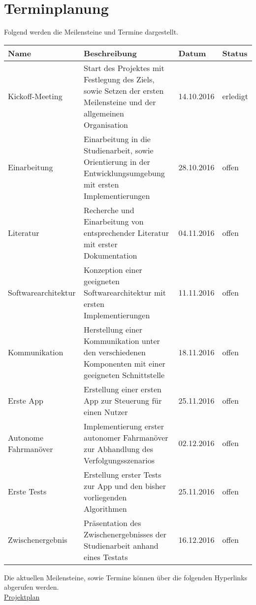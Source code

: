 \section{Terminplanung}

Folgend werden die Meilensteine und Termine dargestellt.\\

\begin{center}
	\begin{tabular}{ | p{} | p{} | p{2cm} | p{2cm} |}
		\hline
		Name & Beschreibung & Datum & Status \\ \hline
		
		Kickoff-Meeting & Start des Projektes mit Festlegung des Ziels, sowie Setzen der ersten Meilensteine und der allgemeinen Organisation & 14.10.2016 & erledigt \\ \hline
		
		Einarbeitung & Einarbeitung in die Studienarbeit, sowie Orientierung in der Entwicklungsumgebung mit ersten Implementierungen & 28.10.2016 & offen \\ \hline
		
		Literatur & Recherche und Einarbeitung von entsprechender Literatur mit erster Dokumentation  & 04.11.2016 & offen \\ \hline
		
		Softwarearchitektur & Konzeption einer geeigneten Softwarearchitektur mit ersten Implementierungen  & 11.11.2016 & offen \\ \hline
		
		Kommunikation & Herstellung einer Kommunikation unter den verschiedenen Komponenten mit einer geeigneten Schnittstelle & 18.11.2016 & offen \\ \hline
		
		Erste App & Erstellung einer ersten App zur Steuerung für einen Nutzer & 25.11.2016 & offen \\ \hline
		
		Autonome Fahrmanöver & Implementierung erster autonomer Fahrmanöver zur Abhandlung des Verfolgungsszenarios & 02.12.2016 & offen \\ \hline
		
		Erste Tests & Erstellung erster Tests zur App und den bisher vorliegenden Algorithmen & 25.11.2016 & offen \\ \hline
		
		Zwischenergebnis & Präsentation des Zwischenergebnisses der Studienarbeit anhand eines Testats & 16.12.2016 & offen \\
		\hline
	\end{tabular}
\end{center}

\noindent
Die aktuellen Meilensteine, sowie Termine können über die folgenden Hyperlinks abgerufen werden.\\

\noindent
\href{https://drive.google.com/open?id=1ViuqjhD2qScxqwsiT9SPqadOxtXT6824zpyBscX9YxI}{Projektplan}